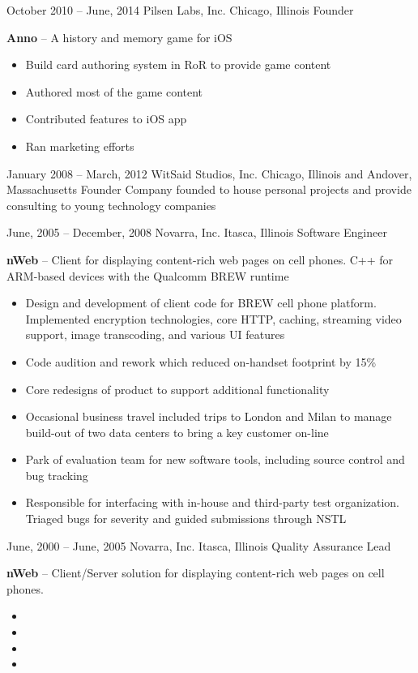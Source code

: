 \documentclass[]{friggeri-cv}
\begin{document}
\begin{entrylist}
    \entryalt
    {October 2010 -- June, 2014}
    {Pilsen Labs, Inc.}
    {Chicago, Illinois}
    {Founder}
    {\textbf{Anno} -- A history and memory game for iOS
    \begin{itemize}
      \item Build card authoring system in RoR to provide game content
      \item Authored most of the game content
      \item Contributed features to iOS app
      \item Ran marketing efforts
    \end{itemize}}

    \entryalt
    {January 2008 -- March, 2012}
    {WitSaid Studios, Inc.}
    {Chicago, Illinois and Andover, Massachusetts}
    {Founder}
    {Company founded to house personal projects and provide consulting to young technology companies}

    \entryalt
    {June, 2005 -- December, 2008}
    {Novarra, Inc.}
    {Itasca, Illinois}
    {Software Engineer}
    {\textbf{nWeb} -- Client for displaying content-rich web pages on cell phones. C++ for ARM-based devices with the Qualcomm BREW runtime
    \begin{itemize}
      \item Design and development of client code for BREW cell phone platform. Implemented encryption technologies, core HTTP, caching, streaming video support, image transcoding, and various UI features
      \item Code audition and rework which reduced on-handset footprint by 15\%
      \item Core redesigns of product to support additional functionality
      \item Occasional business travel included trips to London and Milan to manage build-out of two data centers to bring a key customer on-line
      \item Park of evaluation team for new software tools, including source control and bug tracking
      \item Responsible for interfacing with in-house and third-party test organization. Triaged bugs for severity and guided submissions through NSTL
     \end{itemize}}
     
     \entryalt
    {June, 2000 -- June, 2005}
    {Novarra, Inc.}
    {Itasca, Illinois}
    {Quality Assurance Lead}
    {\textbf{nWeb} -- Client/Server solution for displaying content-rich web pages on cell phones.     \begin{itemize}
      \item 
      \item 
      \item 
      \item 
     \end{itemize}}
     
\end{entrylist} 
    
\end{document}
